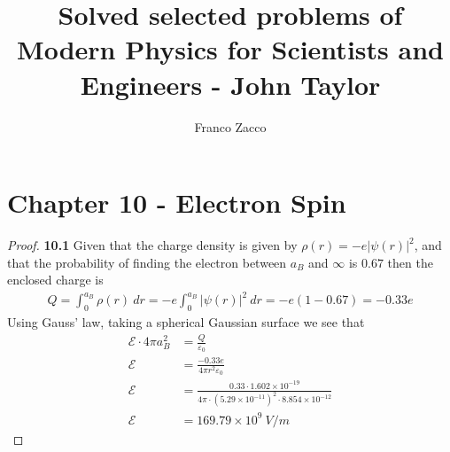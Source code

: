 \documentclass[11pt]{article}
\title{\textbf{Solved selected problems of Modern Physics for Scientists and Engineers - John Taylor}}
\author{Franco Zacco}
\date{}
\newcommand{\sci}[1]{\times 10^{#1}}
\theoremstyle{definition}
\begin{document}
\maketitle
\thispagestyle{empty}

\section*{Chapter 10 - Electron Spin}

\begin{proof}{\textbf{10.1}}
Given that the charge density is given by $\rho(r) = -e|\psi(r)|^2$, and that
the probability of finding the electron between $a_B$ and $\infty$ is $0.67$
then the enclosed charge is
\begin{align*}
    Q = \int_0^{a_B} \rho(r)~dr = -e\int_0^{a_B} |\psi(r)|^2~dr = -e(1 - 0.67)
    = -0.33e
\end{align*}
Using Gauss' law, taking a spherical Gaussian surface we see that
\begin{align*}
    \mathscr{E} \cdot 4\pi a_B^2 &= \frac{Q}{\varepsilon_0}\\
    \mathscr{E} &= \frac{-0.33e}{4\pi r^2 \varepsilon_0}\\
    \mathscr{E} &= \frac{0.33\cdot 1.602\sci{-19}}
    {4\pi \cdot (5.29\sci{-11})^2 \cdot 8.854\sci{-12}}\\
    \mathscr{E} &= 169.79\sci{9}~V/m
\end{align*}
\end{proof}
\end{document}
